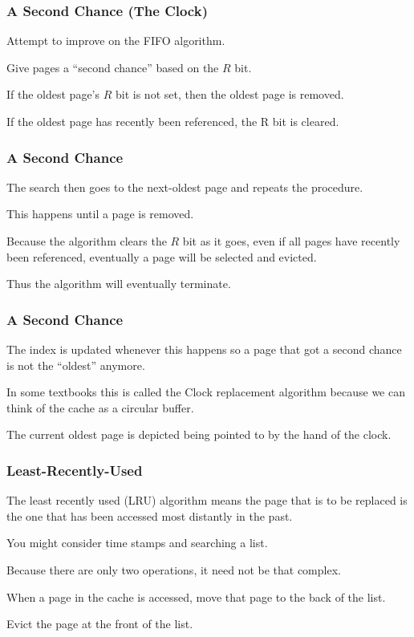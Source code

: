 \begin{frame}
\frametitle{A Second Chance (The Clock)}

Attempt to improve on the FIFO algorithm.

Give pages a ``second chance'' based on the $R$ bit.

If the oldest page's $R$ bit is not set, then the oldest page is removed. 

If the oldest page has recently been referenced, the R bit is cleared.

\end{frame}

\begin{frame}
\frametitle{A Second Chance}

The search then goes to the next-oldest page and repeats the procedure. 

This happens until a page is removed. 

Because the algorithm clears the $R$ bit as it goes, even if all pages have recently been referenced, eventually a page will be selected and evicted. 

Thus the algorithm will eventually terminate. 

\end{frame}

\begin{frame}
\frametitle{A Second Chance}

The index is updated whenever this happens so a page that got a second chance is not the ``oldest'' anymore. 

In some textbooks this is called the Clock replacement algorithm because we can think of the cache as a circular buffer.

The current oldest page is depicted being pointed to by the hand of the clock.

\end{frame}

\begin{frame}
\frametitle{Least-Recently-Used}

The least recently used (LRU) algorithm means the page that is to be replaced is the one that has been accessed most distantly in the past. 

You might consider time stamps and searching a list.

Because there are only two operations, it need not be that complex. 

When a page in the cache is accessed, move that page to the back of the list.

Evict the page at the front of the list.

\end{frame}

